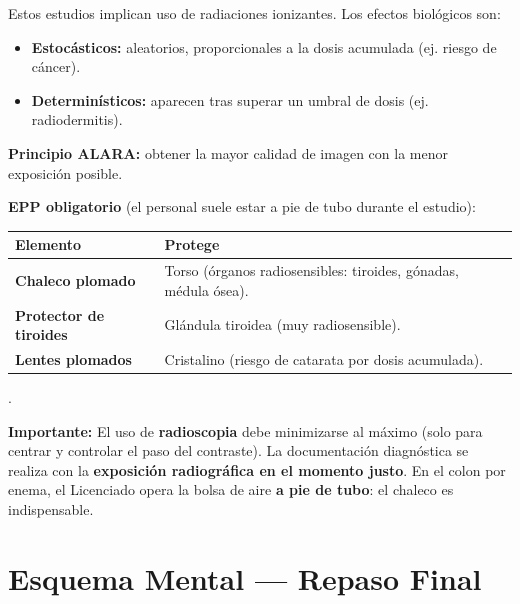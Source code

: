 Estos estudios implican uso de radiaciones ionizantes. Los efectos biológicos son:
\begin{itemize}[noitemsep]
	\item \textbf{Estocásticos:} aleatorios, proporcionales a la dosis acumulada (ej. riesgo de cáncer).
	\item \textbf{Determinísticos:} aparecen tras superar un umbral de dosis (ej. radiodermitis).
\end{itemize}

\textbf{Principio ALARA:} obtener la mayor calidad de imagen con la menor exposición posible.

\textbf{EPP obligatorio} (el personal suele estar a pie de tubo durante el estudio):

{\renewcommand{\arraystretch}{1.25}
	\begin{center}
		\begin{tabular}{>{\bfseries}p{4cm} p{9cm}}
			\hline
			Elemento & Protege \\
			\hline
			Chaleco plomado & Torso (órganos radiosensibles: tiroides, gónadas, médula ósea). \\
			\hline
			Protector de tiroides & Glándula tiroidea (muy radiosensible). \\
			\hline
			Lentes plomados & Cristalino (riesgo de catarata por dosis acumulada). \\
			\hline
		\end{tabular}
	\end{center}
}
.\\

\begin{cajariesgo}
	\textbf{Importante:} El uso de \textbf{radioscopia} debe minimizarse al máximo (solo para centrar y controlar el paso del contraste). La documentación diagnóstica se realiza con la \textbf{exposición radiográfica en el momento justo}. En el colon por enema, el Licenciado opera la bolsa de aire \textbf{a pie de tubo}: el chaleco es indispensable.
\end{cajariesgo}

\section*{Esquema Mental --- Repaso Final}


